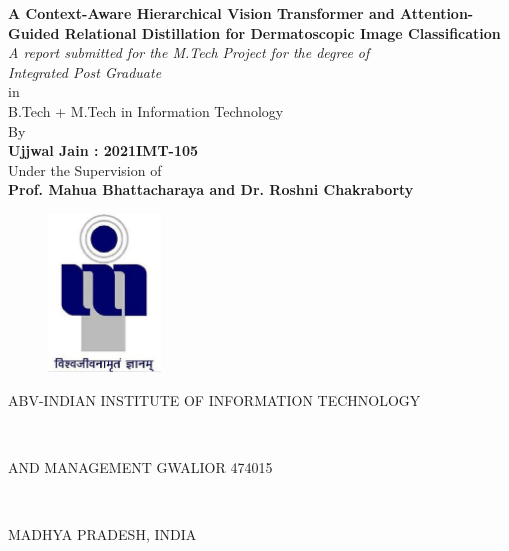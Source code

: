 \begin{center}
\fontsize{15.8pt}{19pt}\selectfont
{\textbf{A Context-Aware Hierarchical Vision Transformer and Attention-Guided Relational Distillation for Dermatoscopic Image Classification \\}}
\vspace*{0.15in}
\emph{\large{A report submitted for the M.Tech Project for the degree of}} \\
\emph{\large{Integrated Post Graduate \\}}
\large{in \\}
\large{B.Tech + M.Tech in Information Technology\\}
\large{By}\\
 \large{\textbf{Ujjwal Jain : 2021IMT-105}} \\
\large{Under the Supervision of} \\
 \large{\textbf{Prof. Mahua Bhattacharaya and Dr. Roshni Chakraborty}} \\
\end{center}
\begin{figure}[!h]
\centerline{\includegraphics*[width = 3cm]{FrontPages/ABV_IIITM_logo.eps}}
\end{figure}
\centerline {\large{ABV-INDIAN INSTITUTE OF INFORMATION TECHNOLOGY }}\\
\centerline{\large{AND MANAGEMENT GWALIOR 474015}} \vspace*{0.05in}\\
\centerline{\large{MADHYA PRADESH, INDIA}} \vspace*{0.05in}
